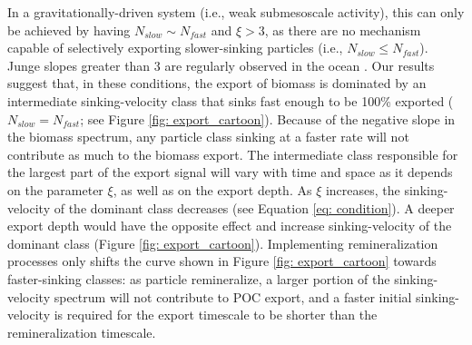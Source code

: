 \documentclass[draft,linenumbers]{agujournal2018}
\begin{document}
In a gravitationally-driven system (i.e., weak submesoscale activity), this can only be achieved by having  $N_{slow} \sim N_{fast}$ and $\xi>3$, as there are no mechanism capable of selectively exporting slower-sinking particles (i.e., $N_{slow} \leq N_{fast}$). Junge slopes greater than 3 are regularly observed in the ocean \citep{Kostadinov_2009, White_2015}. Our results suggest that, in these conditions, the export of biomass is dominated by an intermediate sinking-velocity class that sinks fast enough to be 100\% exported ($N_{slow} = N_{fast}$; see Figure \ref{fig: export_cartoon}). Because of the negative slope in the biomass spectrum, any particle class sinking at a faster rate will not contribute as much to the biomass export. The intermediate class responsible for the largest part of the export signal will vary with time and space as it depends on the parameter $\xi$, as well as on the export depth. As $\xi$ increases, the sinking-velocity of the dominant class decreases (see Equation \ref{eq: condition}). A deeper export depth would have the opposite effect and increase sinking-velocity of the dominant class (Figure \ref{fig: export_cartoon}). Implementing remineralization processes only shifts the curve shown in Figure \ref{fig: export_cartoon} towards faster-sinking classes: as particle remineralize, a larger portion of the sinking-velocity spectrum will not contribute to POC export, and a faster initial sinking-velocity is required for the export timescale to be shorter than the remineralization timescale.
\end{document}
